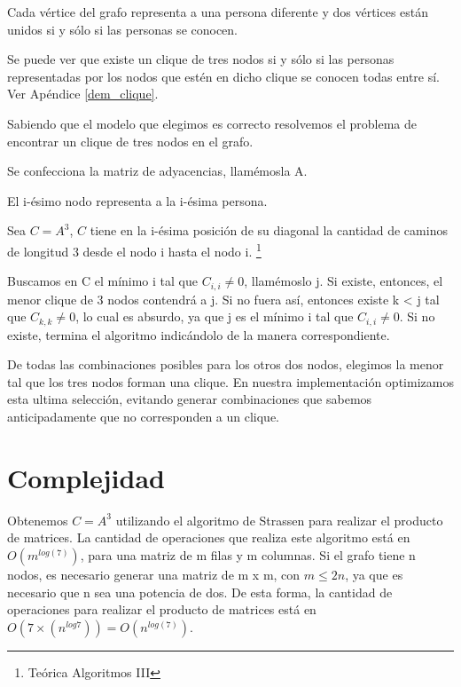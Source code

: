 \documentclass[a4paper, 12pt]{article}
\begin{document}
Cada v\'ertice del grafo representa a una persona diferente y dos v\'ertices est\'an unidos si y s\'olo si las personas se conocen.


Se puede ver que existe un clique de tres nodos si y s\'olo si las personas representadas por los nodos que est\'en en dicho clique se conocen todas entre s\'i. Ver Ap\'endice \ref{dem_clique}.


Sabiendo que el modelo que elegimos es correcto resolvemos el problema de encontrar un clique de tres nodos en el grafo.


Se confecciona la matriz de adyacencias, llam\'emosla A.


El i-\'esimo nodo representa a la i-\'esima persona.


Sea $C = A^3$, $C$ tiene en la i-\'esima posici\'on de su diagonal la cantidad de caminos de longitud 3 desde el nodo i hasta el nodo i. \footnote{Te\'orica Algoritmos III}   

 
Buscamos en C el m\'inimo i tal que $C_{i,i} \neq 0$, llam\'emoslo j. Si existe, entonces, el menor clique de 3 nodos contendr\'a a j. Si no fuera as\'i, entonces existe k < j tal que $C_{k,k} \neq 0$, lo cual es absurdo, ya que j es el m\'inimo i tal que $C_{i,i} \neq 0$. Si no existe, termina el algoritmo indic\'andolo de la manera correspondiente.

De todas las combinaciones posibles para los otros dos nodos, elegimos la menor tal que los tres nodos forman una clique. En nuestra implementaci\'on optimizamos esta ultima selecci\'on, evitando generar combinaciones que sabemos anticipadamente que no corresponden a un clique.



\section*{Complejidad}


Obtenemos $C = A^3$ utilizando el algoritmo de Strassen para realizar el producto de matrices. La cantidad de operaciones que realiza este algoritmo est\'a en $O\left(m^{log\left(7\right)}\right)$, para una matriz de m filas y m columnas. Si el grafo tiene n nodos, es necesario generar una matriz de m x m, con $m \leq 2n$, ya que es necesario que n sea una potencia de dos. De esta forma, la cantidad de operaciones para realizar el producto de matrices est\'a en $O\left(7 \times \left(n ^{log 7} \right) \right) = O\left(n^{log\left(7\right)}\right)$.
\end{document}
